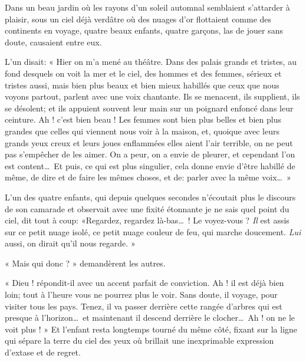 Dans un beau jardin où les rayons d’un soleil automnal
semblaient s’attarder à plaisir, sous un ciel déjà
verdâtre où des nuages d’or flottaient comme des
continents en voyage, quatre beaux enfants, quatre garçons, las de
jouer sans doute, causaient entre eux.

L’un disait: « Hier on m’a mené au
théâtre. Dans des palais grands et tristes, au fond desquels on voit la
mer et le ciel, des hommes et des femmes, sérieux et tristes aussi,
mais bien plus beaux et bien mieux habillés que ceux que nous voyons
partout, parlent avec une voix chantante. Ils se menacent, ils
supplient, ils se désolent; et ils appuient souvent leur main sur un
poignard enfoncé dans leur ceinture. Ah ! c’est bien
beau ! Les femmes sont bien plus belles et bien plus grandes que celles
qui viennent nous voir à la maison, et, quoique avec leurs grands yeux
creux et leurs joues enflammées elles aient l’air
terrible, on ne peut pas s’empêcher de les aimer. On a
peur, on a envie de pleurer, et cependant l’on est
content\ldots\ Et puis, ce qui est plus singulier, cela donne envie
d’être habillé de même, de dire et de faire les mêmes
choses, et de: parler avec la même voix\ldots\ »

L’un des quatre enfants, qui depuis quelques secondes
n’écoutait plus le discours de son camarade et
observait avec une fixité étonnante je ne sais quel point du ciel, dit
tout à coup: «Regardez, regardez là{}-bas\ldots\ ! Le voyez{}-vous ? \textit{Il} est
assis sur ce petit nuage isolé, ce petit nuage couleur de feu, qui
marche doucement. \textit{Lui} aussi, on dirait qu’il nous
regarde. »

« Mais qui donc ? » demandèrent les autres.

« Dieu ! répondit{}-il avec un accent parfait de conviction. Ah ! il est
déjà bien loin; tout à l’heure vous ne pourrez plus le
voir. Sans doute, il voyage, pour visiter tous les pays. Tenez, il va
passer derrière cette rangée d’arbres qui est presque
à l’horizon\ldots\ et maintenant il descend derrière le
clocher\ldots\ Ah ! on ne le voit plus ! » Et l’enfant
resta longtemps tourné du même côté, fixant sur la ligne qui sépare la
terre du ciel des yeux où brillait une inexprimable expression
d’extase et de regret.

